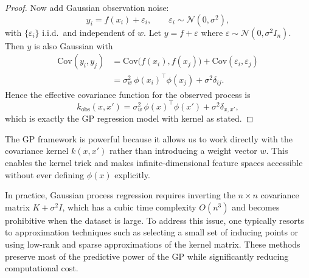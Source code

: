 \documentclass[../main]{subfiles}
\begin{document}
\begin{proof}
    Now add Gaussian observation noise:
    \begin{equation}
        y_i = f(x_i) + \varepsilon_i,
        \qquad
        \varepsilon_i \sim \mathcal N(0,\sigma^2),
    \end{equation}
    with $\{\varepsilon_i\}$ i.i.d.\ and independent of $w$.
    Let $y = f + \varepsilon$ where
    $\varepsilon \sim \mathcal N(0,\sigma^2 I_n)$.
    Then $y$ is also Gaussian with
    \begin{align}
        \mathrm{Cov}(y_i,y_j)
        &= \mathrm{Cov}\bigl(f(x_i),f(x_j)\bigr)
           + \mathrm{Cov}(\varepsilon_i,\varepsilon_j) \\
        &= \sigma_w^2\, \phi(x_i)^\top \phi(x_j)
           + \sigma^2 \delta_{ij}.
    \end{align}
    Hence the effective covariance function for the observed process is
    \begin{equation}
        k_{\mathrm{obs}}(x,x')
        = \sigma_w^2\, \phi(x)^\top \phi(x') + \sigma^2 \delta_{x,x'},
    \end{equation}
    which is exactly the GP regression model with kernel as stated.
\end{proof}
\begin{remark}
    The GP framework is powerful because it allows us to work directly
    with the covariance kernel $k(x,x')$ rather than introducing a weight
    vector $w$.  
    This enables the kernel trick and makes infinite-dimensional feature
    spaces accessible without ever defining $\phi(x)$ explicitly.
\end{remark}
\begin{remark}
    In practice, Gaussian process regression requires inverting the
    $n\times n$ covariance matrix $K+\sigma^{2}I$, which has a cubic time
    complexity $O(n^{3})$ and becomes prohibitive when the dataset is
    large.  
    To address this issue, one typically resorts to approximation
    techniques such as selecting a small set of inducing points or using
    low-rank and sparse approximations of the kernel matrix.  
    These methods preserve most of the predictive power of the GP while
    significantly reducing computational cost.
\end{remark}
\end{document}
